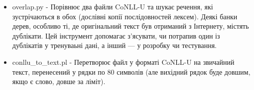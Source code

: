 \begin{itemize}
  \item overlap.py - Порівнює два файли CoNLL-U та шукає речення, які
  зустрічаються в обох (дослівні копії послідовностей лексем). Деякі банки
  дерев, особливо ті, де оригінальний текст був отриманий з Інтернету, містять
  дублікати. Цей інструмент допомагає з’ясувати, чи потрапив один із дублікатів у тренуваьні дані, а інший — у розробку чи тестування.
  
  \item conllu\_to\_text.pl - Перетворює файл у форматі CoNLL-U на звичайний
  текст, перенесений у рядки по 80 символів 
  (але вихідний рядок буде довшим, якщо є слово, довше за ліміт).
  
\end{itemize}